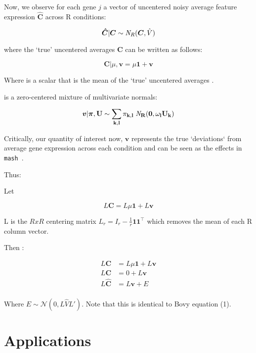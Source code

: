 \documentclass[11pt, oneside]{article}   	%
\newcommand{\Norm}{{\mathcal{N}}} %
\newcommand{\ceff}{\bm{C}}
\newcommand{\chat}{\bm{\hat{C}}}
\newcommand{\vb}{\bm{v}}
\def\mash{{\tt mash }}
\begin{document}
Now, we observe for each gene $j$ a vector of uncentered noisy average feature expression $\chat$ across R conditions:

\begin{equation}
  \label{nobaselike}
\chat | \bm{\ceff} \sim {\it N}_R(\bm{\ceff}, \hat{V})
\end{equation}

where the `true' uncentered averages $\ceff$ can be written as follows:

\begin{equation}
  \label{uncenteredprior}
\ceff | \mu, \vb  = \mu \bm{1} + \vb
\end{equation}

Where \mu is a scalar that is the mean of the `true' uncentered averages \ceff.

\vb is a zero-centered mixture of multivariate normals:


 \begin{equation}
  \label{prior_v_mix}
  \vb | \bm{\pi},\bf{U} \sim \sum_{k,l} \pi_{k,l} \;{\it N}_R(\bm{0}, \omega_l U_{k})
\end{equation}

Critically, our quantity of interest now, $\vb$  represents the true `deviations` from average gene expression across each condition and can be seen as the effects in \mash{}.

Thus:

Let 

\begin{equation}
L \ceff = L \mu \bm{1} + L \vb
\end{equation}

L is the $RxR$ centering matrix $L_{r}=I_{r}-{\tfrac  {1}{r}}{\mathbf  {1}}{\mathbf  {1}}^{\top }$ which removes the mean of each R column vector.

Then :

\begin{equation}
\label{model}
\begin{aligned}
L \ceff &= L \mu \bm{1}+ L \vb \\
L \ceff &= 0 + L \vb \\
L \chat &= L \vb + E \\
\end{aligned}
\end{equation}

Where $E \sim \Norm (0, L\hat{V} L')$. Note that this is identical to Bovy equation (1). 




\section{Applications}
\end{document}
